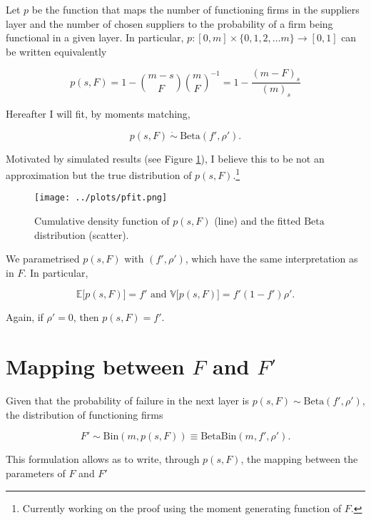 \documentclass[american, abstract=on]{scrartcl}
\theoremstyle{plain}
\newcommand{\E}{\mathbb{E}}
\newcommand{\V}{\mathbb{V}}
\newcommand{\Beta}{\text{Beta}}
\newcommand{\Bin}{\text{Bin}}
\begin{document}
Let $p$ be the function that maps the number of functioning firms in the suppliers layer and the number of chosen suppliers to the probability of a firm being functional in a given layer. In particular, $p: [0, m] \times \{0, 1, 2, \ldots m\} \to [0, 1]$ can be written equivalently

\begin{equation}
    p(s, F) = 1 - \binom{m - s}{F} \binom{m}{F}^{-1} = 1 - \frac{(m - F)_s}{(m)_s}
\end{equation}

Hereafter I will fit, by moments matching,

\begin{equation}
    p(s, F) \ \dot{\sim} \ \Beta(f', \rho').
\end{equation}

Motivated by simulated results (see Figure \ref{fig:pfit}), I believe this to be not an approximation but the true distribution of $p(s, F)$.\footnote{Currently working on the proof using the moment generating function of $F$.}

\begin{figure}[H]
    \centering
    \texttt{[image: ../plots/pfit.png]}
    \caption{Cumulative density function of $p(s, F)$ (line) and the fitted $\Beta$ distribution (scatter).}
    \label{fig:pfit}
\end{figure}

We parametrised $p(s, F)$ with $(f', \rho')$, which have the same interpretation as in $F$. In particular,

\begin{equation}
    \E\big[p(s, F)\big] = f' \text{ and } \V\big[p(s, F)\big] = f' (1 - f')\rho'.
\end{equation}

Again, if $\rho' = 0$, then $p(s, F) = f'$.

\section[Mapping]{Mapping between $F$ and $F'$}

Given that the probability of failure in the next layer is $p(s, F) \sim \Beta(f', \rho')$, the distribution of functioning firms 

\begin{equation}
    F' \sim \Bin(m, p(s, F)) \equiv \Beta\Bin(m, f', \rho').
\end{equation}

This formulation allows as to write, through $p(s, F)$, the mapping between the parameters of $F$ and $F'$
\end{document}
